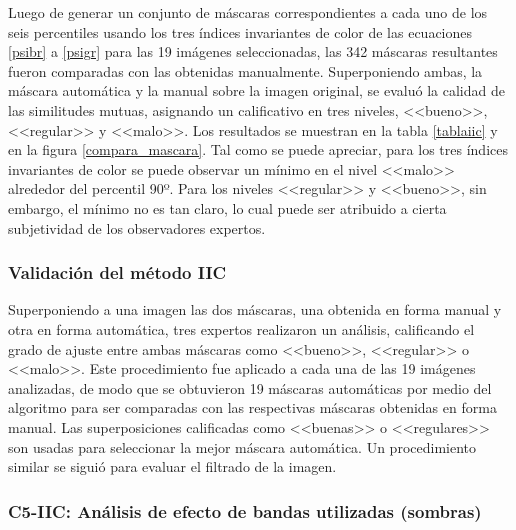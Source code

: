 Luego de generar un conjunto de máscaras correspondientes a cada uno de los seis percentiles usando los tres índices invariantes de color de las ecuaciones \ref{psibr} a \ref{psigr} para las 19 imágenes seleccionadas, las 342 máscaras resultantes fueron comparadas con las obtenidas manualmente. Superponiendo ambas, la máscara automática y la manual sobre la imagen original, se evaluó la calidad de las similitudes mutuas, asignando un calificativo en tres niveles, <<bueno>>, <<regular>> y <<malo>>. Los resultados se muestran en la tabla \ref{tablaiic} y en la figura \ref{compara_mascara}. Tal como se puede apreciar, para los tres índices invariantes de color se puede observar un mínimo en el nivel <<malo>> alrededor del percentil 90º. Para los niveles <<regular>> y <<bueno>>, sin embargo, el mínimo no es tan claro, lo cual puede ser atribuido a cierta subjetividad de los observadores expertos.

 

 


\subsubsection{Validación del método IIC} \label{Validacion}
Superponiendo a una imagen las dos máscaras, una obtenida en forma manual y otra en forma automática, tres expertos realizaron un análisis, calificando el grado de ajuste entre ambas máscaras como <<bueno>>, <<regular>> o <<malo>>. Este procedimiento fue aplicado a cada una de las 19 imágenes analizadas, de modo que se obtuvieron 19 máscaras automáticas por medio del algoritmo para ser comparadas con las respectivas máscaras obtenidas en forma manual. Las superposiciones calificadas como <<buenas>> o <<regulares>> son usadas para seleccionar la mejor máscara automática. Un procedimiento similar se siguió para evaluar el filtrado de la imagen.

\subsubsection{C5-IIC: Análisis de efecto de bandas utilizadas (sombras)} %
